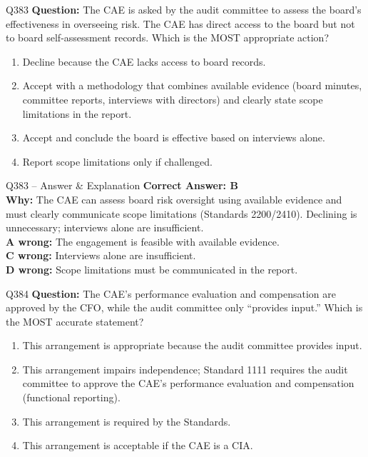 \documentclass[aspectratio=169,10pt]{beamer}
\begin{document}
	\begin{frame}[t]{Q383}
		\small
		\textbf{Question:} The CAE is asked by the audit committee to assess the board's effectiveness in overseeing risk. The CAE has direct access to the board but not to board self-assessment records. Which is the MOST appropriate action?
		\begin{enumerate}[label=\Alph*.,itemsep=1pt,topsep=2pt]
			\item Decline because the CAE lacks access to board records.
			\item Accept with a methodology that combines available evidence (board minutes, committee reports, interviews with directors) and clearly state scope limitations in the report.
			\item Accept and conclude the board is effective based on interviews alone.
			\item Report scope limitations only if challenged.
		\end{enumerate}
	\end{frame}
	
	\begin{frame}[t]{Q383 -- Answer \& Explanation}
		\small
		\textbf{Correct Answer: B} \\[4pt]
		\textbf{Why:} The CAE can assess board risk oversight using available evidence and must clearly communicate scope limitations (Standards 2200/2410). Declining is unnecessary; interviews alone are insufficient. \\[4pt]
		\textbf{A wrong:} The engagement is feasible with available evidence. \\[2pt]
		\textbf{C wrong:} Interviews alone are insufficient. \\[2pt]
		\textbf{D wrong:} Scope limitations must be communicated in the report.
	\end{frame}
	
	\begin{frame}[t]{Q384}
		\small
		\textbf{Question:} The CAE's performance evaluation and compensation are approved by the CFO, while the audit committee only ``provides input.'' Which is the MOST accurate statement?
		\begin{enumerate}[label=\Alph*.,itemsep=1pt,topsep=2pt]
			\item This arrangement is appropriate because the audit committee provides input.
			\item This arrangement impairs independence; Standard 1111 requires the audit committee to approve the CAE's performance evaluation and compensation (functional reporting).
			\item This arrangement is required by the Standards.
			\item This arrangement is acceptable if the CAE is a CIA.
		\end{enumerate}
	\end{frame}
	
\end{document}
